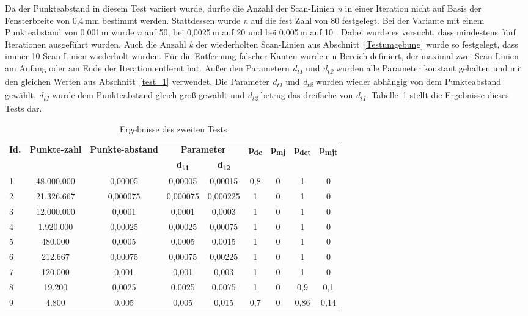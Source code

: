 Da der Punkteabstand in diesem Test variiert wurde, durfte die Anzahl der Scan-Linien \textit{n} in einer Iteration nicht auf Basis der Fensterbreite von 0,4\,\si{\mm} bestimmt werden. Stattdessen wurde \textit{n} auf die fest Zahl von 80 festgelegt. Bei der Variante mit einem Punkteabstand von 0,001\,\si{\m} wurde \textit{n} auf 50, bei 0,0025\,\si{\m} auf 20 und bei 0,005\,\si{\m} auf 10 . Dabei wurde es versucht, dass mindestens fünf Iterationen ausgeführt wurden. Auch die Anzahl \textit{k} der wiederholten Scan-Linien aus Abschnitt~\ref{Testumgebung} wurde so festgelegt, dass immer 10 Scan-Linien wiederholt wurden. Für die Entfernung falscher Kanten wurde ein Bereich definiert, der maximal zwei Scan-Linien am Anfang oder am Ende der Iteration entfernt hat. Außer den Parametern \textit{d\textsubscript{t1}} und \textit{d\textsubscript{t2}} wurden alle Parameter konstant gehalten und mit den gleichen Werten aus Abschnitt~\ref{test_1} verwendet. Die Parameter \textit{d\textsubscript{t1}} und \textit{d\textsubscript{t2}} wurden wieder abhängig von dem Punkteabstand gewählt. \textit{d\textsubscript{t1}} wurde dem Punkteabstand gleich groß gewählt und \textit{d\textsubscript{t2}} betrug das dreifache von \textit{d\textsubscript{t1}}. Tabelle~\ref{table: test_2_results} stellt die Ergebnisse dieses Tests dar.

\begin{table}[b]
	\centering
	\begin{tabular}[width = \textwidth]{l *{8}{c}}
		\hline
		\multirow{2}{2em}{\textbf{Id.}} & \multirow{2}{3em}{\textbf{Punkte-zahl}} & \multirow{2}{3em}{\textbf{Punkte-abstand}} & \multicolumn{2}{c}{\textbf{Parameter}} & \multirow{2}{*}{\textbf{p\textsubscript{dc}}} & \multirow{2}{*}{\textbf{p\textsubscript{mj}}} & \multirow{2}{*}{\textbf{p\textsubscript{dct}}} & \multirow{2}{*}{\textbf{p\textsubscript{mjt}}} \\
		& & & \textbf{d\textsubscript{t1}} &\textbf{d\textsubscript{t2}} & & & & \\
		\hline
		1 & 48.000.000 & 0,00005 & 0,00005 & 0,00015 & 0,8 & 0 & 1 & 0 \\
		2 & 21.326.667 & 0,000075 & 0,000075 & 0,000225 & 1 & 0 & 1 & 0 \\
		3 & 12.000.000 & 0,0001 & 0,0001 & 0,0003 & 1 & 0 & 1 & 0 \\
		4 & 1.920.000 & 0,00025 & 0,00025 & 0,00075 & 1 & 0 & 1 & 0 \\
		5 & 480.000 & 0,0005 & 0,0005 & 0,0015 & 1 & 0 & 1 & 0 \\
		6 & 212.667 & 0,00075 & 0,00075 & 0,00225 & 1 & 0 & 1 & 0 \\
		7 & 120.000 & 0,001	& 0,001 & 0,003 & 1 & 0 & 1 & 0 \\
		8 & 19.200 & 0,0025 & 0,0025 & 0,0075 & 1 & 0 & 0,9 & 0,1 \\
		9 & 4.800 & 0,005 & 0,005 & 0,015 & 0,7 & 0 & 0,86 & 0,14 \\
		\hline 
	\end{tabular}
	\caption[Ergebnisse der zweiten Untersuchung]{Ergebnisse des zweiten Tests}
	\label{table: test_2_results}
\end{table}

